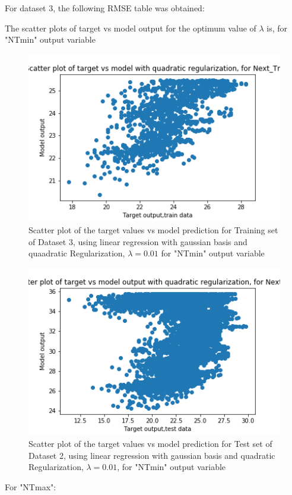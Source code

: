 \documentclass[12pt,a4paper]{article}
\begin{document}
For dataset 3, the following RMSE table was obtained:

The scatter plots of target vs model output for the optimum value of $\lambda$ is, for "NTmin" output variable
\begin{figure}[H]
     \centering
     \includegraphics[scale=0.5]{images/scatter_ds3quadtrainT_min.png}
     \caption{Scatter plot of the target values vs model prediction for Training set of Dataset 3, using linear regression with gaussian basis and quaadratic Regularization, $\lambda = 0.01 $ for "NTmin" output variable}
\end{figure}
\begin{figure}[H]
     \centering
     \includegraphics[scale=0.5]{images/scatter_ds3quadtestT_min.png}
     \caption{Scatter plot of the target values vs model prediction for Test set of Dataset 2, using linear regression with gaussian basis and quadratic Regularization, $\lambda = 0.01 $, for "NTmin" output variable}
\end{figure}
For "NTmax":
\end{document}
